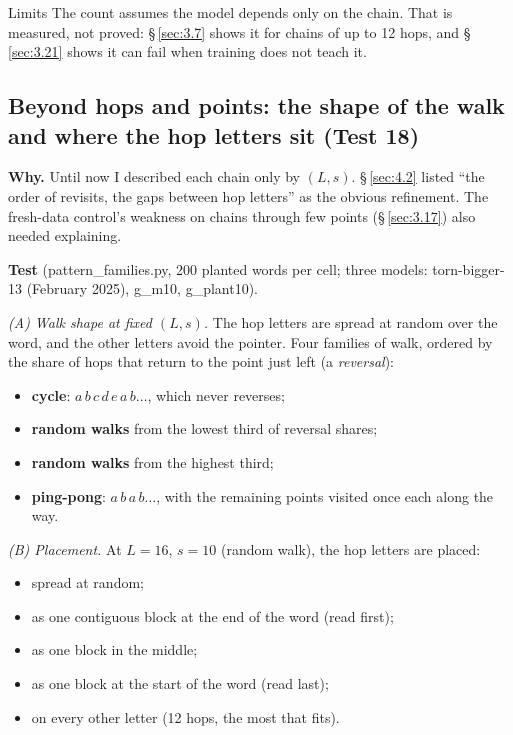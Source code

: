 \documentclass[paper=a4,fontsize=11pt,DIV=11,parskip=half,headings=small,numbers=noendperiod]{scrartcl}
\DeclareRobustCommand{\lead}[1]{\textsf{\bfseries\color{accent}#1}}
\DeclareRobustCommand{\code}[1]{{\fontseries{m}\ttfamily #1}}
\begin{document}
\begin{limbox}{Limits}
The count assumes the model depends only on the chain. That is measured, not proved: \S\,\ref{sec:3.7} shows it
for chains of up to 12 hops, and \S\,\ref{sec:3.21} shows it can fail when training does not teach it.
\end{limbox}

\subsection{Beyond hops and points: the shape of the walk and where the hop letters sit (Test
18)}\label{sec:3.20}
\lead{Why.} Until now I described each chain only by $(L,s)$. \S\,\ref{sec:4.2} listed “the order of revisits,
the gaps between hop letters” as the obvious refinement. The fresh-data control’s weakness on chains through few
points (\S\,\ref{sec:3.17}) also needed explaining.

\lead{Test} (\code{pattern\_\allowbreak{}families.\allowbreak{}py}, 200 planted words per cell; three models:
\code{torn-\allowbreak{}bigger-\allowbreak{}13} (February 2025), \code{g\_\allowbreak{}m10},
\code{g\_\allowbreak{}plant10}).

\emph{(A) Walk shape at fixed $(L,s)$.} The hop letters are spread at random over the word, and the other
letters avoid the pointer. Four families of walk, ordered by the share of hops that return to the point just
left (a \emph{reversal}):

\begin{itemize}
\item \lead{cycle}: $a\,b\,c\,d\,e\,a\,b\ldots$, which never reverses;
\item \lead{random walks} from the lowest third of reversal shares;
\item \lead{random walks} from the highest third;
\item \lead{ping-pong}: $a\,b\,a\,b\ldots$, with the remaining points visited once each along the way.
\end{itemize}

\emph{(B) Placement.} At $L=16$, $s=10$ (random walk), the hop letters are placed:

\begin{itemize}
\item spread at random;
\item as one contiguous block at the end of the word (read first);
\item as one block in the middle;
\item as one block at the start of the word (read last);
\item on every other letter (12 hops, the most that fits).
\end{itemize}
\end{document}
